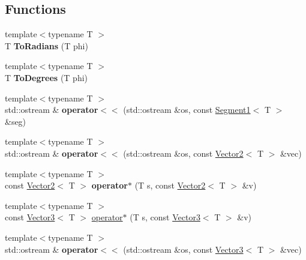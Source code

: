 \subsection*{Functions}
\begin{DoxyCompactItemize}
\item 
\mbox{\label{namespaceastu_ac13e1b419a86ec00b6db5c6fdd5a8217}} 
{\footnotesize template$<$typename T $>$ }\\T {\bfseries To\+Radians} (T phi)
\item 
\mbox{\label{namespaceastu_a56a1d7dbe26dbea944cb5191b3f1f1de}} 
{\footnotesize template$<$typename T $>$ }\\T {\bfseries To\+Degrees} (T phi)
\item 
\mbox{\label{namespaceastu_a34becc3c41709aabece9398b8cfaade3}} 
{\footnotesize template$<$typename T $>$ }\\std\+::ostream \& {\bfseries operator$<$$<$} (std\+::ostream \&os, const \hyperlink{classastu_1_1Segment1}{Segment1}$<$ T $>$ \&seg)
\item 
\mbox{\label{namespaceastu_a8904990eaf59e29c6764a2766f2d8c78}} 
{\footnotesize template$<$typename T $>$ }\\std\+::ostream \& {\bfseries operator$<$$<$} (std\+::ostream \&os, const \hyperlink{classastu_1_1Vector2}{Vector2}$<$ T $>$ \&vec)
\item 
\mbox{\label{namespaceastu_a7519101e7f1f1488db7e257e6aa774f7}} 
{\footnotesize template$<$typename T $>$ }\\const \hyperlink{classastu_1_1Vector2}{Vector2}$<$ T $>$ {\bfseries operator$\ast$} (T s, const \hyperlink{classastu_1_1Vector2}{Vector2}$<$ T $>$ \&v)
\item 
{\footnotesize template$<$typename T $>$ }\\const \hyperlink{classastu_1_1Vector3}{Vector3}$<$ T $>$ \hyperlink{namespaceastu_a758ac6ac57c86535b599271149ab9c1b}{operator$\ast$} (T s, const \hyperlink{classastu_1_1Vector3}{Vector3}$<$ T $>$ \&v)
\item 
\mbox{\label{namespaceastu_af986fc6bf189a1a722c2862c94342614}} 
{\footnotesize template$<$typename T $>$ }\\std\+::ostream \& {\bfseries operator$<$$<$} (std\+::ostream \&os, const \hyperlink{classastu_1_1Vector3}{Vector3}$<$ T $>$ \&vec)

\end{DoxyCompactItemize}
